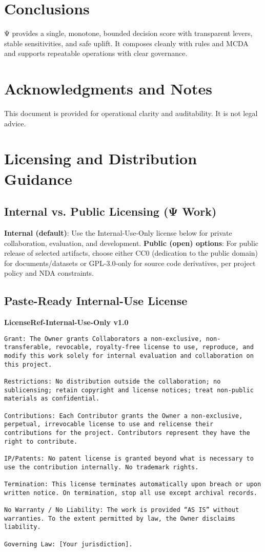 \documentclass[12pt,a4paper]{article}
\begin{document}
\section{Conclusions}
Ψ provides a single, monotone, bounded decision score with transparent levers, stable sensitivities, and safe uplift. It composes cleanly with rules and MCDA and supports repeatable operations with clear governance.

\section*{Acknowledgments and Notes}
This document is provided for operational clarity and auditability. It is not legal advice.

\appendix
\section{Licensing and Distribution Guidance}\label{app:licensing}
\subsection*{Internal vs. Public Licensing (Ψ Work)}
\textbf{Internal (default)}: Use the Internal-Use-Only license below for private collaboration, evaluation, and development.\newline
\textbf{Public (open) options}: For public release of selected artifacts, choose either CC0 (dedication to the public domain) for documents/datasets or GPL-3.0-only for source code derivatives, per project policy and NDA constraints.

\subsection*{Paste-Ready Internal-Use License}
\noindent\textbf{LicenseRef-Internal-Use-Only v1.0}
\begin{lstlisting}[style=code]
Grant: The Owner grants Collaborators a non-exclusive, non-transferable, revocable, royalty-free license to use, reproduce, and modify this work solely for internal evaluation and collaboration on this project.

Restrictions: No distribution outside the collaboration; no sublicensing; retain copyright and license notices; treat non-public materials as confidential.

Contributions: Each Contributor grants the Owner a non-exclusive, perpetual, irrevocable license to use and relicense their contributions for the project. Contributors represent they have the right to contribute.

IP/Patents: No patent license is granted beyond what is necessary to use the contribution internally. No trademark rights.

Termination: This license terminates automatically upon breach or upon written notice. On termination, stop all use except archival records.

No Warranty / No Liability: The work is provided “AS IS” without warranties. To the extent permitted by law, the Owner disclaims liability.

Governing Law: [Your jurisdiction].
\end{lstlisting}
\end{document}
